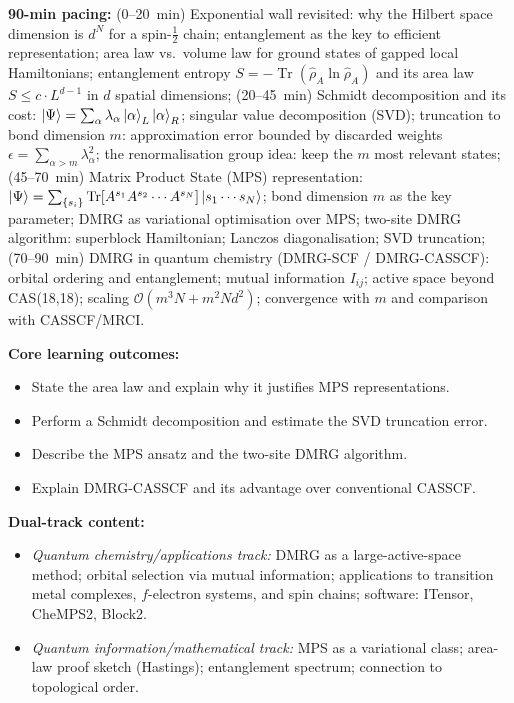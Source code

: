 \documentclass[11pt,a4paper]{article}
\begin{document}
\begin{tcolorbox}[modulebox, title={Module~II.1 / L07: Density Matrix Renormalisation Group}]
\textbf{90-min pacing:} (0--20~min) Exponential wall revisited: why the Hilbert space
dimension is $d^N$ for a spin-$\tfrac{1}{2}$ chain; entanglement as the key to efficient
representation; area law vs.\ volume law for ground states of gapped local Hamiltonians;
entanglement entropy $S = -\operatorname{Tr}(\hat{\rho}_A \ln\hat{\rho}_A)$
and its area law $S \leq c \cdot L^{d-1}$ in $d$ spatial dimensions;
(20--45~min) Schmidt decomposition and its cost: $\ket{\Psi}=\sum_\alpha \lambda_\alpha
\ket{\alpha}_L\ket{\alpha}_R$; singular value decomposition (SVD);
truncation to bond dimension $m$: approximation error bounded by discarded weights
$\epsilon = \sum_{\alpha>m}\lambda_\alpha^2$;
the renormalisation group idea: keep the $m$ most relevant states;
(45--70~min) Matrix Product State (MPS) representation:
$\ket{\Psi}=\sum_{\{s_i\}}\text{Tr}[A^{s_1}A^{s_2}\cdots A^{s_N}]\ket{s_1\cdots s_N}$;
bond dimension $m$ as the key parameter; DMRG as variational optimisation over MPS;
two-site DMRG algorithm: superblock Hamiltonian; Lanczos diagonalisation; SVD truncation;
(70--90~min) DMRG in quantum chemistry (DMRG-SCF / DMRG-CASSCF):
orbital ordering and entanglement; mutual information $I_{ij}$;
active space beyond CAS(18,18); scaling $\mathcal{O}(m^3 N + m^2 N d^2)$;
convergence with $m$ and comparison with CASSCF/MRCI.

\medskip\textbf{Core learning outcomes:}
\begin{itemize}[leftmargin=1.4em,topsep=2pt,itemsep=1pt]
  \item State the area law and explain why it justifies MPS representations.
  \item Perform a Schmidt decomposition and estimate the SVD truncation error.
  \item Describe the MPS ansatz and the two-site DMRG algorithm.
  \item Explain DMRG-CASSCF and its advantage over conventional CASSCF.
\end{itemize}

\medskip\textbf{Dual-track content:}
\begin{itemize}[leftmargin=1.4em,topsep=2pt,itemsep=1pt]
  \item \textit{Quantum chemistry/applications track:} DMRG as a large-active-space method;
    orbital selection via mutual information; applications to transition metal complexes,
    $f$-electron systems, and spin chains; software: ITensor, CheMPS2, Block2.
  \item \textit{Quantum information/mathematical track:} MPS as a variational class;
    area-law proof sketch (Hastings); entanglement spectrum; connection to topological order.
\end{itemize}


\end{tcolorbox}
\end{document}
